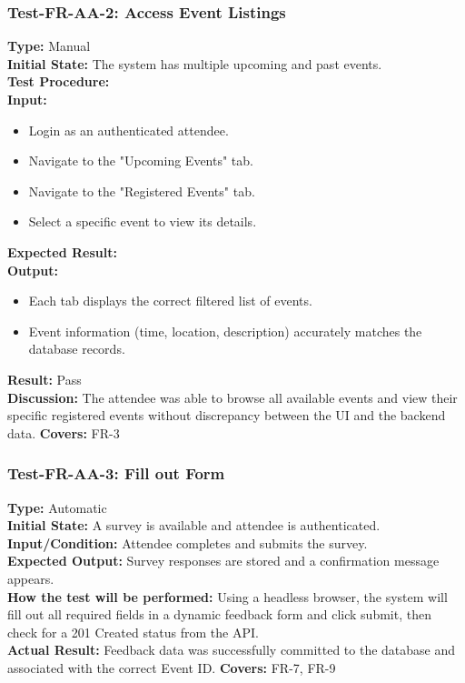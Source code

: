 \documentclass[12pt, titlepage]{article}
\begin{document}
\subsubsection{Test-FR-AA-2: Access Event Listings}
\textbf{Type:} Manual \\
\textbf{Initial State:} The system has multiple upcoming and past events. \\
\textbf{Test Procedure:} \\
\textbf{Input:}
\begin{itemize}
    \item Login as an authenticated attendee.
    \item Navigate to the "Upcoming Events" tab.
    \item Navigate to the "Registered Events" tab.
    \item Select a specific event to view its details.
\end{itemize}
\textbf{Expected Result:} \\
\textbf{Output:}
\begin{itemize}
    \item Each tab displays the correct filtered list of events.
    \item Event information (time, location, description) accurately matches the database records.
\end{itemize}
\textbf{Result:} Pass \\
\textbf{Discussion:} The attendee was able to browse all available events and view their specific registered events without discrepancy between the UI and the backend data.
\textbf{Covers:} FR-3 \\

\subsubsection{Test-FR-AA-3: Fill out Form}
\textbf{Type:} Automatic \\
\textbf{Initial State:} A survey is available and attendee is authenticated. \\
\textbf{Input/Condition:} Attendee completes and submits the survey. \\
\textbf{Expected Output:} Survey responses are stored and a confirmation message appears. \\
\textbf{How the test will be performed:} Using a headless browser, the system will fill out all required fields in a dynamic feedback form and click submit, then check for a 201 Created status from the API. \\
\textbf{Actual Result:} Feedback data was successfully committed to the database and associated with the correct Event ID.
\textbf{Covers:} FR-7, FR-9 \\
\end{document}
